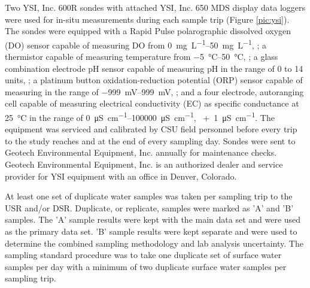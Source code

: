 \begin{linenumbers}
Two YSI, Inc. 600R sondes with attached YSI, Inc. 650 MDS display data loggers were used for in-situ measurements during each sample trip (Figure \ref{pic:ysi}).  The sondes were equipped with a Rapid Pulse polarographic dissolved oxygen (DO) sensor capable of measuring DO from \SIrange{0}{50}{\milli\gram\per\liter}, ; a thermistor capable of measuring temperature from \SIrange{-5}{50}{\degreeCelsius}, ; a glass combination electrode pH sensor capable of measuring pH in the range of 0 to 14 units, ; a platinum button oxidation-reduction potential (ORP) sensor capable of measuring in the range of \SIrange{-999}{999}{\milli\volt}, ; and a four electrode, autoranging  cell capable of measuring electrical conductivity (EC) as specific conductance at \SI{25}{\degreeCelsius} in the range of \SIrange{0}{100000}{\micro\siemens\per\centi\meter}, ~+~\SI{1}{\micro\siemens\per\centi\meter}.  The equipment was serviced and calibrated by CSU field personnel before every trip to the study reaches and at the end of every sampling day.  Sondes were sent to Geotech Environmental Equipment, Inc. annually for maintenance checks.  Geotech Environmental Equipment, Inc. is an authorized dealer and service provider for YSI equipment with an office in Denver, Colorado.

At least one set of duplicate water samples was taken per sampling trip to the USR and/or DSR.  Duplicate, or replicate, samples were marked as 'A' and 'B' samples.  The 'A' sample results were kept with the main data set and were used as the primary data set.  'B' sample results were kept separate and were used to determine the combined sampling methodology and lab analysis uncertainty.  The sampling standard procedure was to take one duplicate set of surface water samples per day with a minimum of two duplicate surface water samples per sampling trip.


\end{linenumbers}
